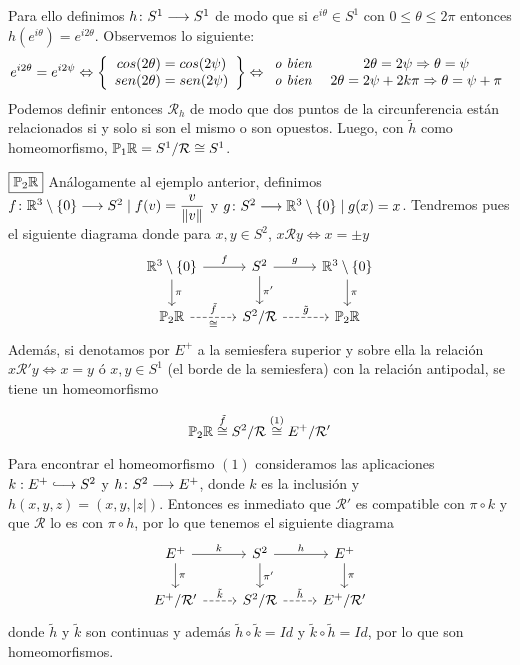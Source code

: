 \documentclass[GTS.tex]{subfiles}
\begin{document}
\begin{ej}
Para ello definimos $h\colon{S^1}\longrightarrow{S^1}$ de modo que si $e^{i\theta}\in S^1$ con $0\leq\theta\leq 2\pi$ entonces $h(e^{i\theta})=e^{i2\theta}$. Observemos lo siguiente:
\begin{gather*}
e^{i2\theta}=e^{i2\psi}\Leftrightarrow\left\{\begin{array}{c}
cos(2\theta)=cos(2\psi)\\
sen(2\theta)=sen(2\psi)
\end{array}\right\}\Leftrightarrow\begin{array}{c c}
\textit{o bien } & 2\theta=2\psi\Rightarrow\theta=\psi\\
\textit{o bien } & 2\theta=2\psi+2k\pi\Rightarrow\theta=\psi+\pi
\end{array}
\end{gather*}
Podemos definir entonces $\mathcal{R}_h$ de modo que dos puntos de la circunferencia están relacionados si y solo si son el mismo o son opuestos. Luego, con $\tilde{h}$ como homeomorfismo, $\mathbb{P}_1\mathbb{R}=S^1/\mathcal{R}\cong S^1$.\\
\item[$\boxed{\mathbb{P}_2\mathbb{R}}$] Análogamente al ejemplo anterior, definimos $f\colon{\mathbb{R}^3\setminus\{0\}}\longrightarrow{S^2}\mid f(v)=\dfrac{v}{\lVert v\rVert}$ y $g\colon{S^2}\longrightarrow{\mathbb{R}^3\setminus\{0\}}\mid g(x)=x$. Tendremos pues el siguiente diagrama donde para $x,y \in S^2$, $x\mathcal{R}y\Leftrightarrow x=\pm y$
\[
\begin{tikzcd}
\R^3\setminus\{0\} \ar[r, "f"]\arrow[d,"\pi "] & S^2 \arrow[r,"g"]\arrow[d,"\pi' "] & \R^3\setminus\{0\}\arrow[d,"\pi "]\\
\Pro_2\R \arrow[r, dashrightarrow, "\tilde{f} ","\cong"'] & S^2/\mathcal{R}\arrow[r, dashrightarrow, "\tilde{g} "] & \Pro_2\R
\end{tikzcd}
\]
Además, si denotamos por $E^+$ a la semiesfera superior y sobre ella la relación $x\mathcal{R}'y\Leftrightarrow x=y$ ó $x,y\in S^1$ (el borde de la semiesfera) con la relación antipodal, se tiene un homeomorfismo

\begin{equation*}
\mathbb{P}_2\mathbb{R}\overset{\tilde{f}}{\cong} S^2/\mathcal{R}\overset{(1)}{\cong} E^+/\mathcal{R}'
\end{equation*}

Para encontrar el homeomorfismo $(1)$ consideramos las aplicaciones $k:E^+\longhookarrow S^2$ y $h\colon{S^2}\longrightarrow{E^+}$, donde $k$ es la inclusión y $h(x,y,z)=(x,y,|z|)$. Entonces es inmediato que $\mathcal{R}'$ es compatible con $\pi\circ k$ y que $\mathcal{R}$ lo es con $\pi\circ h$, por lo que tenemos el siguiente diagrama
\[
\begin{tikzcd}
E^+ \ar[r, "k"]\arrow[d,"\pi "] & S^2 \arrow[r,"h"]\arrow[d,"\pi' "] & E^+\arrow[d,"\pi "]\\
E^+/\mathcal{R}' \arrow[r, dashrightarrow, "\tilde{k} "] & S^2/\mathcal{R}\arrow[r, dashrightarrow, "\tilde{h} "] & E^+/\mathcal{R}'
\end{tikzcd}
\]
donde $\tilde{h}$ y $\tilde{k}$ son continuas y además $\tilde{h}\circ\tilde{k}=Id$ y $\tilde{k}\circ\tilde{h}=Id$, por lo que son homeomorfismos.


\end{ej}
\end{document}
